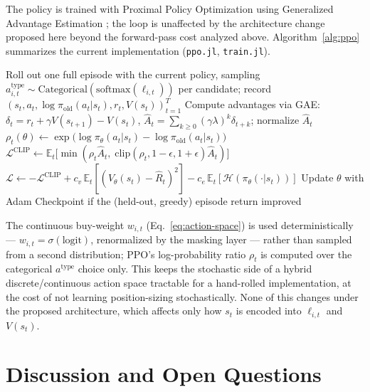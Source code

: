 \documentclass[11pt]{article}
\newcommand{\code}[1]{\texttt{#1}}
\begin{document}
The policy is trained with Proximal Policy Optimization
\citep{schulman2017ppo} using Generalized Advantage Estimation
\citep{schulman2016gae}; the loop is unaffected by the architecture change
proposed here beyond the forward-pass cost analyzed above.
Algorithm~\ref{alg:ppo} summarizes the current implementation
(\code{ppo.jl}, \code{train.jl}).

\begin{algorithm}[h!]
\caption{TradingGame training iteration}
\label{alg:ppo}
\begin{algorithmic}[1]
\State Roll out one full episode with the current policy, sampling
       $a^{\text{type}}_{i,t}\sim\mathrm{Categorical}(\mathrm{softmax}(\ell_{i,t}))$
       per candidate; record $(s_t,a_t,\log\pi_{\text{old}}(a_t|s_t),r_t,V(s_t))_{t=1}^{T}$
\State Compute advantages via GAE: $\delta_t = r_t + \gamma V(s_{t+1}) - V(s_t)$,
       $\hat{A}_t = \sum_{k\ge0}(\gamma\lambda)^k\delta_{t+k}$; normalize $\hat{A}_t$
  \State $\rho_t(\theta) \leftarrow \exp\big(\log\pi_\theta(a_t|s_t) - \log\pi_{\text{old}}(a_t|s_t)\big)$
  \State $\mathcal{L}^{\text{CLIP}} \leftarrow \mathbb{E}_t\big[\min(\rho_t\hat{A}_t,\;
         \mathrm{clip}(\rho_t,1{-}\epsilon,1{+}\epsilon)\hat{A}_t)\big]$
  \State $\mathcal{L} \leftarrow -\mathcal{L}^{\text{CLIP}} + c_v\,\mathbb{E}_t[(V_\theta(s_t)-\hat{R}_t)^2] - c_e\,\mathbb{E}_t[\mathcal{H}(\pi_\theta(\cdot|s_t))]$
  \State Update $\theta$ with Adam \citep{kingma2015adam}
\EndFor
\State Checkpoint if the (held-out, greedy) episode return improved
\end{algorithmic}
\end{algorithm}

The continuous buy-weight $w_{i,t}$ (Eq.~\eqref{eq:action-space}) is used
deterministically --- $w_{i,t}=\sigma(\text{logit})$, renormalized by the
masking layer --- rather than sampled from a second distribution; PPO's
log-probability ratio $\rho_t$ is computed over the categorical
$a^{\text{type}}$ choice only. This keeps the stochastic side of a hybrid
discrete/continuous action space tractable for a hand-rolled
implementation, at the cost of not learning position-sizing stochastically.
None of this changes under the proposed architecture, which affects only
how $s_t$ is encoded into $\ell_{i,t}$ and $V(s_t)$.

\section{Discussion and Open Questions}
\label{sec:discussion}
\end{document}
